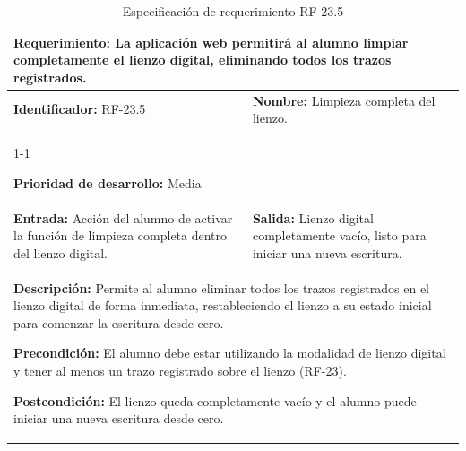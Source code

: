 \begin{longtable}{|p{7cm}|p{8cm}|}
\caption{Especificación de requerimiento RF-23.5}
\label{tab:rf23_5} \\ \hline

\multicolumn{2}{|p{15cm}|}{\textbf{Requerimiento:} La aplicación web permitirá al alumno limpiar completamente el lienzo digital, eliminando todos los trazos registrados.} \\ \hline

\textbf{Identificador:} RF-23.5 &
\textbf{Nombre:} Limpieza completa del lienzo. \\ \cline{1-1}

\textbf{Prioridad de desarrollo:} Media &
\multicolumn{1}{p{8cm}|}{} \\ \hline

\textbf{Entrada:} Acción del alumno de activar la función de limpieza completa dentro del lienzo digital. &
\textbf{Salida:} Lienzo digital completamente vacío, listo para iniciar una nueva escritura. \\ \hline

\multicolumn{2}{|p{15cm}|}{
\textbf{Descripción:} Permite al alumno eliminar todos los trazos registrados en el lienzo digital de forma inmediata, restableciendo el lienzo a su estado inicial para comenzar la escritura desde cero.

\vspace{0.2cm}
\textbf{Precondición:} El alumno debe estar utilizando la modalidad de lienzo digital y tener al menos un trazo registrado sobre el lienzo (RF-23).

\vspace{0.2cm}
\textbf{Postcondición:} El lienzo queda completamente vacío y el alumno puede iniciar una nueva escritura desde cero.
} \\ \hline

\end{longtable}

